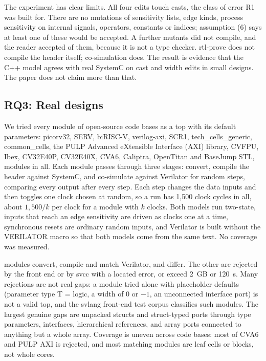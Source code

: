\documentclass{ieeeaccess}
\newcommand{\code}[1]{{\fontshape{n}\ttfamily #1}}
\begin{document}
The experiment has clear limits. All four edits touch casts, the class of error R1 was built for.
There are no mutations of sensitivity lists, edge kinds, process sensitivity on internal signals,
operators, constants or indices; assumption (6) says at least one of these would be accepted. A
further \nMutNoCompile{} mutants did not compile, and the reader accepted \nMutNoCompileRead{} of
them, because it is not a type checker. \code{rtl-prove} does not compile the header itself;
co-simulation does. The result is evidence that the C++ model agrees with real SystemC on cast
and width edits in small designs. The paper does not claim more than that.

\subsection{RQ3: Real designs}
\label{sec:stress}

We tried every module of \nCodeBases{} open-source code bases as a top with its default
parameters: picorv32, SERV, biRISC-V, verilog-axi, SCR1, tech\_cells\_generic, common\_cells,
the PULP Advanced eXtensible Interface (AXI) library, CVFPU, Ibex, CV32E40P, CV32E40X, CVA6, Caliptra, OpenTitan and BaseJump STL, \nModules{}
modules in all. Each module passes through three stages: convert, compile the header against
SystemC, and co-simulate against Verilator for \nSteps{} random steps, comparing every output after
every step. Each step changes the data inputs and then toggles one clock chosen at random, so a run has
1,500 clock cycles in all, about $1{,}500/k$ per clock for a module with $k$ clocks. Both models run two-state, inputs that reach an edge
sensitivity are driven as clocks one at a time, synchronous resets are ordinary random inputs, and
Verilator is built without the \code{VERILATOR} macro so that both models come from the same text.
No coverage was measured.

\nMatch{} modules convert, compile and match Verilator, and \nMismatch{} differ. The other
\nRejected{} are rejected by the front end or by \code{svcc} with a located error, or exceed 2~GB or
120~s. Many rejections are not real gaps: a module tried alone with placeholder defaults
(\code{parameter type T = logic}, a width of 0 or $-1$, an unconnected interface port) is not a valid
top, and the \code{svlang} front-end test corpus classifies \nPlaceholder{} such modules. The
largest genuine gaps are unpacked structs and struct-typed ports through type parameters,
interfaces, hierarchical references, and array ports connected to anything but a whole array.
Coverage is uneven across code bases: most of CVA6 and PULP AXI is rejected, and most matching
modules are leaf cells or blocks, not whole cores.
\end{document}
